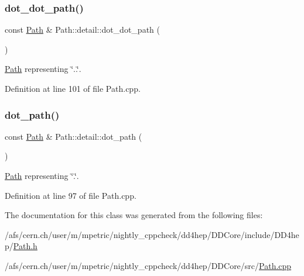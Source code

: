 \subsubsection{\texorpdfstring{dot\+\_\+dot\+\_\+path()}{dot\_dot\_path()}}
{\footnotesize\ttfamily const \hyperlink{class_d_d4hep_1_1_path}{Path} \& Path\+::detail\+::dot\+\_\+dot\+\_\+path (\begin{DoxyParamCaption}{ }\end{DoxyParamCaption})\hspace{0.3cm}{\ttfamily [static]}}



\hyperlink{class_d_d4hep_1_1_path}{Path} representing \char`\"{}..\char`\"{}. 



Definition at line 101 of file Path.\+cpp.

\hypertarget{class_d_d4hep_1_1_path_1_1detail_ab5518d01c92d39c37cb48ad8ffeb5aa5}{}\label{class_d_d4hep_1_1_path_1_1detail_ab5518d01c92d39c37cb48ad8ffeb5aa5} 
\subsubsection{\texorpdfstring{dot\+\_\+path()}{dot\_path()}}
{\footnotesize\ttfamily const \hyperlink{class_d_d4hep_1_1_path}{Path} \& Path\+::detail\+::dot\+\_\+path (\begin{DoxyParamCaption}{ }\end{DoxyParamCaption})\hspace{0.3cm}{\ttfamily [static]}}



\hyperlink{class_d_d4hep_1_1_path}{Path} representing \char`\"{}.\char`\"{}. 



Definition at line 97 of file Path.\+cpp.



The documentation for this class was generated from the following files\+:\begin{DoxyCompactItemize}
\item 
/afs/cern.\+ch/user/m/mpetric/nightly\+\_\+cppcheck/dd4hep/\+D\+D\+Core/include/\+D\+D4hep/\hyperlink{_path_8h}{Path.\+h}\item 
/afs/cern.\+ch/user/m/mpetric/nightly\+\_\+cppcheck/dd4hep/\+D\+D\+Core/src/\hyperlink{_path_8cpp}{Path.\+cpp}\end{DoxyCompactItemize}
